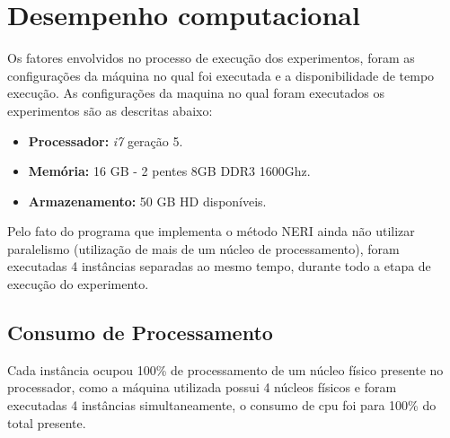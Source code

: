 \section{Desempenho computacional}




Os fatores envolvidos no processo de execução dos experimentos, foram as configurações da máquina no qual foi executada e a disponibilidade de tempo execução.
As configurações da maquina no qual foram executados os experimentos são as descritas abaixo:

\begin{itemize}
    \item \textbf{Processador:} \textsl{i7} geração 5.
    \item \textbf{Memória:} 16 GB - 2 pentes 8GB DDR3 1600Ghz.
    \item \textbf{Armazenamento:} 50 GB HD disponíveis.
\end{itemize}

 
Pelo fato do programa que implementa o método NERI ainda não utilizar paralelismo (utilização de mais de um núcleo de processamento), foram executadas 4 instâncias separadas ao mesmo tempo, durante todo a etapa de execução do experimento.

\subsection{Consumo de Processamento}
Cada instância ocupou 100\% de processamento de um núcleo físico presente no processador, como a máquina utilizada possui 4 núcleos físicos e foram executadas 4 instâncias simultaneamente, o consumo de cpu foi para 100\% do total presente.


